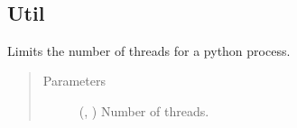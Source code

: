 \documentclass[letterpaper,10pt,english]{sphinxmanual}
\begin{document}
\begin{fulllineitems}
\label{\detokenize{utils/grad_cam:utils.grad_cam.normalize}}~
\end{fulllineitems}



\subsection{Util}
\label{\detokenize{utils/util:module-utils.util}}\label{\detokenize{utils/util:util}}\label{\detokenize{utils/util::doc}}

\begin{fulllineitems}
\label{\detokenize{utils/util:utils.util.limit_threads}}
Limits the number of threads for a python process.
\begin{quote}\begin{description}
\item[{Parameters}] \leavevmode
{} (, ) \textendash{} Number of threads.

\end{description}\end{quote}

\end{fulllineitems}

\end{document}
